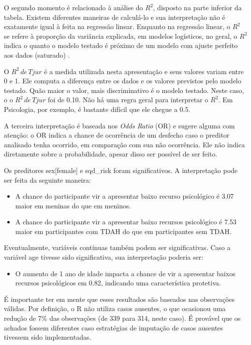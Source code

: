 \documentclass[
]{book}
\providecommand{\tightlist}{%
  \setlength{\itemsep}{0pt}\setlength{\parskip}{0pt}}
\begin{document}
O segundo momento é relacionado à análise do \(R^2\), disposto na parte inferior da tabela. Existem diferentes maneiras de calculá-lo e sua interpretação não é exatamente igual à feita na regressão linear. Enquanto na regressão linear, o \(R^2\) se refere à proporção da variância explicada, em modelos logísticos, no geral, o \(R^2\) indica o quanto o modelo testado é próximo de um modelo com ajuste perfeito aos dados (saturado) \citep{portugues2020}.

O \(R^2 \, de \, Tjur\) é a medida utilizada nesta apresentação e seus valores variam entre 0 e 1. Ele computa a diferença entre os dados e os valores previstos pelo modelo testado. Quão maior o valor, mais discriminativo é o modelo testado. Neste caso, o o \(R^2 \, de \, Tjur\) foi de 0.10. Não há uma regra geral para interpretar o \(R^2\). Em Psicologia, por exemplo, é bastante difícil que ele chegue a 0.5.

A terceira interpretação é baseada nos \emph{Odds Ratio} (OR) e sugere alguma com atenção: o OR indica a chance de ocorrência de um desfecho caso o preditor analisado tenha ocorrido, em comparação com sua não ocorrência. Ele não indica diretamente sobre a probabilidade, apesar disso ser possível de ser feito.

Os preditores sex{[}female{]} e sqd\_risk foram significativos. A interpretação pode ser feita da seguinte maneira:

\begin{itemize}
\tightlist
\item
  A chance do participante vir a apresentar baixo recurso psicológico é 3.07 maior em meninas do que em meninos.
\item
  A chance do participante vir a apresentar baixo recursos psicológico é 7.53 maior em participantes com TDAH do que em participantes sem TDAH.
\end{itemize}

Eventualmente, variáveis contínuas também podem ser significativas. Caso a variável age tivesse sido significativa, sua interpretação poderia ser:

\begin{itemize}
\tightlist
\item
  O aumento de 1 ano de idade impacta a chance de vir a apresentar baixos recursos psicológicos em 0.82, indicando uma característica protetiva.
\end{itemize}

É importante ter em mente que esses resultados são baseados nas observações válidas. Por definição, o R não utiliza casos ausentes, o que ocasionou uma redução de 7\% das observações (de 339 para 314, neste caso). É provável que os achados fossem diferentes caso estratégias de imputação de casos ausentes tivessem sido implementadas.
\end{document}
